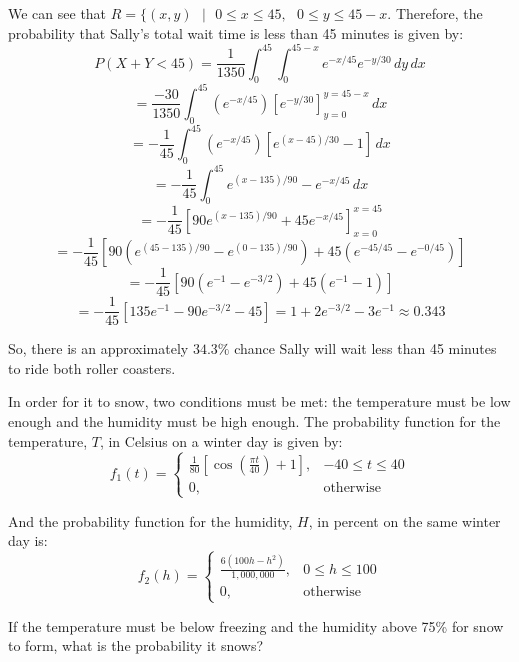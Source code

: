 \begin{Worked}
\begin{Solution}
We can see that $R = \{(x, y)\text{ }|\text{ }0 \leq x \leq 45,\text{ }0 \leq 
y \leq 45 - x$. Therefore, the probability that Sally's total wait time is less
than 45 minutes is given by:
$$P(X + Y < 45) = \frac{1}{1350} \int_0^{45} \int_0^{45 - x} e^{-x/45} e^{-y/30
}\,dy\,dx$$
$$= \frac{-30}{1350} \int_0^{45} \left(e^{-x/45} \right) \left[e^{-y/30} 
\right]_{y = 0}^{y = 45 - x}\,dx$$
$$= -\frac{1}{45} \int_0^{45} \left( e^{-x/45} \right) \left[ e^{(x - 45)/30} 
- 1 \right]\,dx$$
$$= -\frac{1}{45} \int_0^{45} e^{(x - 135)/90} - e^{-x/45}\,dx$$
$$= -\frac{1}{45} \left[ 90e^{(x - 135)/90} + 45e^{-x/45} \right]_{x = 0}^{x = 
45}$$
$$= - \frac{1}{45} \left[ 90 \left( e^{(45 - 135)/90} - e^{(0 - 135)/90} 
\right) + 45 \left(e^{-45/45} - e^{-0/45} \right) \right]$$
$$= -\frac{1}{45} \left[90 \left( e^{-1} - e^{-3/2} \right) + 45 \left(e^{-1} 
- 1 \right) \right]$$
$$= -\frac{1}{45} \left[135e^{-1} - 90e^{-3/2} - 45 \right] = 1 + 2e^{-3/2} - 
3e^{-1} \approx 0.343$$

So, there is an approximately $34.3\%$ chance Sally will wait less than 45 
minutes to ride both roller coasters. 
\end{Solution}
\end{Worked}

\begin{Exercise}[title = {Snow Days}, label = snow]
In order for it to snow, two conditions must be met: the temperature must be 
low enough and the humidity must be high enough. The probability function for 
the temperature, $T$, in Celsius on a winter day is given by:
$$f_1(t) = 
\begin{cases}
    \frac{1}{80} \left[ \cos{\left( \frac{\pi t}{40} \right)} + 1 \right],& 
    -40 \leq t \leq 40\\
    0,&\text{otherwise}
\end{cases}
$$

And the probability function for the humidity, $H$, in percent on the same 
winter day is:
$$f_2(h) = 
\begin{cases}
    \frac{6(100h - h^2)}{1{,}000{,}000},& 0 \leq h \leq 100\\
    0,&\text{otherwise}
\end{cases}
$$

If the temperature must be below freezing and the humidity above 75\% for snow 
to form, what is the probability it snows?
\end{Exercise}

